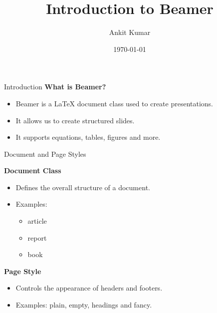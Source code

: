 \documentclass{beamer}
\title{Introduction to Beamer}
\author{Ankit Kumar}
\institute{MNIT Jaipur}
\date{\today}
\begin{document}
\begin{frame}
    \titlepage
\end{frame}

\begin{frame}{Introduction}
    \textbf{What is Beamer?}

    \begin{itemize}
        \item Beamer is a LaTeX document class used to create presentations.
        \item It allows us to create structured slides.
        \item It supports equations, tables, figures and more.
    \end{itemize}
\end{frame}
\begin{frame}{Document and Page Styles}

    \textbf{Document Class}

    \begin{itemize}
        \item Defines the overall structure of a document.
        \item Examples:
        \begin{itemize}
            \item article
            \item report
            \item book
        \end{itemize}
    \end{itemize}

    \vspace{0.3cm}

    \textbf{Page Style}

    \begin{itemize}
        \item Controls the appearance of headers and footers.
        \item Examples: plain, empty, headings and fancy.
    \end{itemize}

\end{frame}
\end{document}

